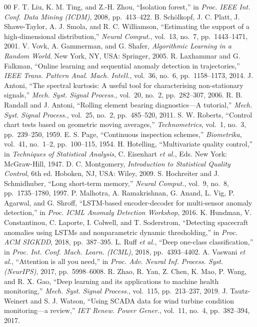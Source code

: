 \documentclass[journal]{IEEEtran}
\begin{document}
\begin{thebibliography}{00}
 F. T. Liu, K. M. Ting, and Z.-H. Zhou, ``Isolation forest,'' in \emph{Proc. IEEE Int. Conf. Data Mining (ICDM)}, 2008, pp.~413--422.
 B. Sch\"olkopf, J. C. Platt, J. Shawe-Taylor, A. J. Smola, and R. C. Williamson, ``Estimating the support of a high-dimensional distribution,'' \emph{Neural Comput.}, vol.~13, no.~7, pp.~1443--1471, 2001.
 V. Vovk, A. Gammerman, and G. Shafer, \emph{Algorithmic Learning in a Random World}. New York, NY, USA: Springer, 2005.
 R. Laxhammar and G. Falkman, ``Online learning and sequential anomaly detection in trajectories,'' \emph{IEEE Trans. Pattern Anal. Mach. Intell.}, vol.~36, no.~6, pp.~1158--1173, 2014.
 J. Antoni, ``The spectral kurtosis: A useful tool for characterising non-stationary signals,'' \emph{Mech. Syst. Signal Process.}, vol.~20, no.~2, pp.~282--307, 2006.
 R. B. Randall and J. Antoni, ``Rolling element bearing diagnostics---A tutorial,'' \emph{Mech. Syst. Signal Process.}, vol.~25, no.~2, pp.~485--520, 2011.
 S. W. Roberts, ``Control chart tests based on geometric moving averages,'' \emph{Technometrics}, vol.~1, no.~3, pp.~239--250, 1959.
 E. S. Page, ``Continuous inspection schemes,'' \emph{Biometrika}, vol.~41, no.~1--2, pp.~100--115, 1954.
 H. Hotelling, ``Multivariate quality control,'' in \emph{Techniques of Statistical Analysis}, C. Eisenhart \emph{et al.}, Eds. New York: McGraw-Hill, 1947.
 D. C. Montgomery, \emph{Introduction to Statistical Quality Control}, 6th ed. Hoboken, NJ, USA: Wiley, 2009.
 S. Hochreiter and J. Schmidhuber, ``Long short-term memory,'' \emph{Neural Comput.}, vol.~9, no.~8, pp.~1735--1780, 1997.
 P. Malhotra, A. Ramakrishnan, G. Anand, L. Vig, P. Agarwal, and G. Shroff, ``LSTM-based encoder-decoder for multi-sensor anomaly detection,'' in \emph{Proc. ICML Anomaly Detection Workshop}, 2016.
 K. Hundman, V. Constantinou, C. Laporte, I. Colwell, and T. Soderstrom, ``Detecting spacecraft anomalies using LSTMs and nonparametric dynamic thresholding,'' in \emph{Proc. ACM SIGKDD}, 2018, pp.~387--395.
 L. Ruff \emph{et al.}, ``Deep one-class classification,'' in \emph{Proc. Int. Conf. Mach. Learn. (ICML)}, 2018, pp.~4393--4402.
 A. Vaswani \emph{et al.}, ``Attention is all you need,'' in \emph{Proc. Adv. Neural Inf. Process. Syst. (NeurIPS)}, 2017, pp.~5998--6008.
 R. Zhao, R. Yan, Z. Chen, K. Mao, P. Wang, and R. X. Gao, ``Deep learning and its applications to machine health monitoring,'' \emph{Mech. Syst. Signal Process.}, vol.~115, pp.~213--237, 2019.
 J. Tautz-Weinert and S. J. Watson, ``Using SCADA data for wind turbine condition monitoring---a review,'' \emph{IET Renew. Power Gener.}, vol.~11, no.~4, pp.~382--394, 2017.
\end{thebibliography}
\end{document}
